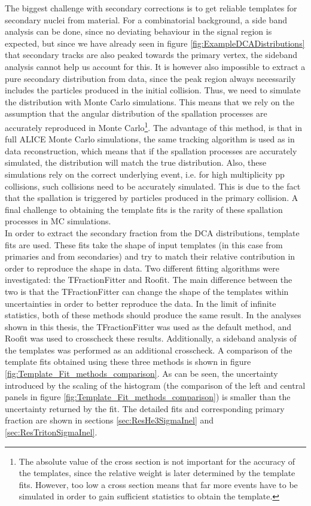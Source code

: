 The biggest challenge with secondary corrections is to get reliable templates for secondary nuclei from material. For a combinatorial background, a side band analysis can be done, since no deviating behaviour in the signal region is expected, but since we have already seen in figure \ref{fig:ExampleDCADistributions} that secondary tracks are also peaked towards the primary vertex, the sideband analysis cannot help us account for this. It is however also impossible to extract a pure secondary distribution from data, since the peak region always necessarily includes the particles produced in the initial collision. Thus, we need to simulate the distribution with Monte Carlo simulations. This means that we rely on the assumption that the angular distribution of the spallation processes are accurately reproduced in Monte Carlo\footnote{The absolute value of the cross section is not important for the accuracy of the templates, since the relative weight is later determined by the template fits. However, too low a cross section means that far more events have to be simulated in order to gain sufficient statistics to obtain the template.}. The advantage of this method, is that in full ALICE Monte Carlo simulations, the same tracking algorithm is used as in data reconstruction, which means that if the spallation processes are accurately simulated, the distribution will match the true distribution. Also, these simulations rely on the correct underlying event, i.e. for high multiplicity pp collisions, such collisions need to be accurately simulated. This is due to the fact that the spallation is triggered by particles produced in the primary collision. A final challenge to obtaining the template fits is the rarity of these spallation processes in MC simulations. \\


In order to extract the secondary fraction from the DCA distributions, template fits are used. These fits take the shape of input templates (in this case from primaries and from secondaries) and try to match their relative contribution in order to reproduce the shape in data. Two different fitting algorithms were investigated: the TFractionFitter and Roofit. The main difference between the two is that the TFractionFitter can change the shape of the templates within uncertainties in order to better reproduce the data. In the limit of infinite statistics, both of these methods should produce the same result. In the analyses shown in this thesis, the TFractionFitter was used as the default method, and Roofit was used to crosscheck these results. Additionally, a sideband analysis of the templates was performed as an additional crosscheck. A comparison of the template fits obtained using these three methods is shown in figure \ref{fig:Template_Fit_methods_comparison}. As can be seen, the uncertainty introduced by the scaling of the histogram (the comparison of the left and central panels in figure \ref{fig:Template_Fit_methods_comparison}) is smaller than the uncertainty returned by the fit. The detailed fits and corresponding primary fraction are shown in sections \ref{sec:ResHe3SigmaInel} and \ref{sec:ResTritonSigmaInel}.\\   

